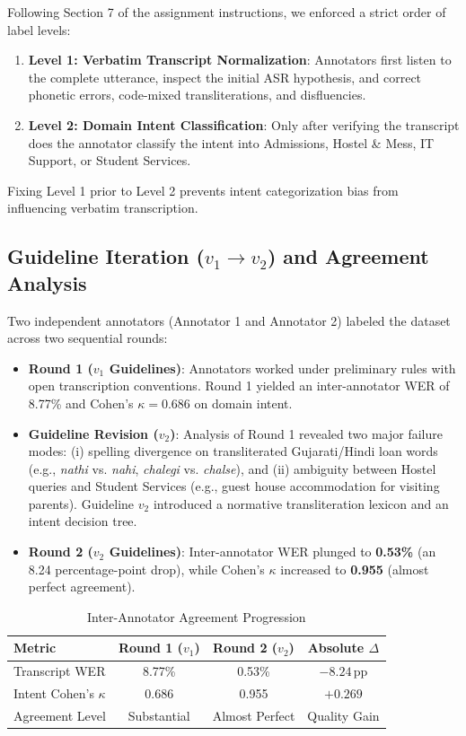 \documentclass[10pt,a4paper,twocolumn]{article}
\renewcommand{\_}{\origunderscore\hspace{0pt}}
\begin{document}
Following Section 7 of the assignment instructions, we enforced a strict order of label levels:
\begin{enumerate}
    \item \textbf{Level 1: Verbatim Transcript Normalization}: Annotators first listen to the complete utterance, inspect the initial ASR hypothesis, and correct phonetic errors, code-mixed transliterations, and disfluencies.
    \item \textbf{Level 2: Domain Intent Classification}: Only after verifying the transcript does the annotator classify the intent into Admissions, Hostel \& Mess, IT Support, or Student Services.
\end{enumerate}
Fixing Level 1 prior to Level 2 prevents intent categorization bias from influencing verbatim transcription.

\subsection{Guideline Iteration ($v_1 \to v_2$) and Agreement Analysis}
Two independent annotators (Annotator 1 and Annotator 2) labeled the dataset across two sequential rounds:
\begin{itemize}
    \item \textbf{Round 1 ($v_1$ Guidelines)}: Annotators worked under preliminary rules with open transcription conventions. Round 1 yielded an inter-annotator WER of 8.77\% and Cohen's $\kappa = 0.686$ on domain intent.
    \item \textbf{Guideline Revision ($v_2$)}: Analysis of Round 1 revealed two major failure modes: (i) spelling divergence on transliterated Gujarati/Hindi loan words (e.g., \textit{nathi} vs. \textit{nahi}, \textit{chalegi} vs. \textit{chalse}), and (ii) ambiguity between Hostel queries and Student Services (e.g., guest house accommodation for visiting parents). Guideline $v_2$ introduced a normative transliteration lexicon and an intent decision tree.
    \item \textbf{Round 2 ($v_2$ Guidelines)}: Inter-annotator WER plunged to \textbf{0.53\%} (an 8.24 percentage-point drop), while Cohen's $\kappa$ increased to \textbf{0.955} (almost perfect agreement).
\end{itemize}

\begin{table}[htbp]
\centering
\footnotesize
\renewcommand{\arraystretch}{1.15}
\setlength{\tabcolsep}{3pt}
\caption{Inter-Annotator Agreement Progression}
\label{tab:agreement}
\begin{tabularx}{\columnwidth}{Y C C C}
\toprule
\textbf{Metric} & \textbf{Round 1 ($v_1$)} & \textbf{Round 2 ($v_2$)} & \textbf{Absolute $\Delta$} \\
\midrule
Transcript WER          & 8.77\%      & 0.53\%         & $-8.24$\,pp \\
Intent Cohen's $\kappa$ & 0.686       & 0.955          & $+0.269$ \\
Agreement Level         & Substantial & Almost Perfect & Quality Gain \\
\bottomrule
\end{tabularx}
\end{table}
\end{document}
